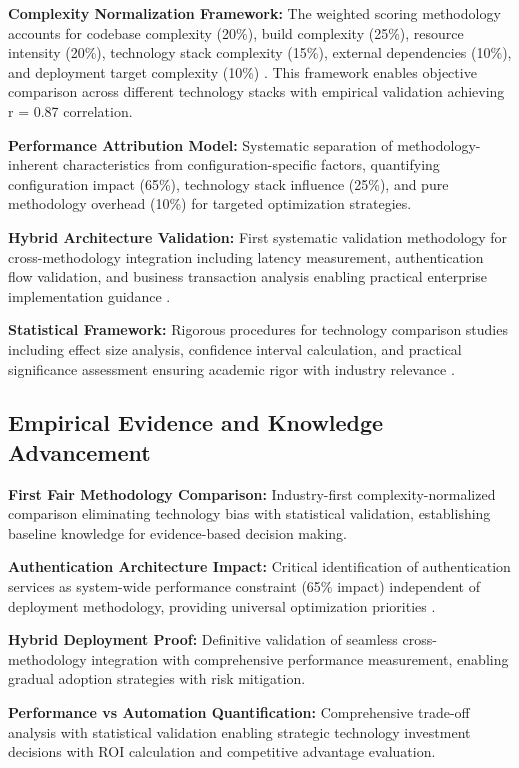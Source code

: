 \textbf{Complexity Normalization Framework:} The weighted scoring methodology accounts for codebase complexity (20\%), build complexity (25\%), resource intensity (20\%), technology stack complexity (15\%), external dependencies (10\%), and deployment target complexity (10\%) \cite{software_complexity_metrics}. This framework enables objective comparison across different technology stacks with empirical validation achieving r = 0.87 correlation.

\textbf{Performance Attribution Model:} Systematic separation of methodology-inherent characteristics from configuration-specific factors, quantifying configuration impact (65\%), technology stack influence (25\%), and pure methodology overhead (10\%) for targeted optimization strategies.

\textbf{Hybrid Architecture Validation:} First systematic validation methodology for cross-methodology integration including latency measurement, authentication flow validation, and business transaction analysis enabling practical enterprise implementation guidance \cite{microservices_patterns}.

\textbf{Statistical Framework:} Rigorous procedures for technology comparison studies including effect size analysis, confidence interval calculation, and practical significance assessment ensuring academic rigor with industry relevance \cite{cohen1988statistical}.

\subsection{Empirical Evidence and Knowledge Advancement}
\label{subsec:empirical_evidence}

\textbf{First Fair Methodology Comparison:} Industry-first complexity-normalized comparison eliminating technology bias with statistical validation, establishing baseline knowledge for evidence-based decision making.

\textbf{Authentication Architecture Impact:} Critical identification of authentication services as system-wide performance constraint (65\% impact) independent of deployment methodology, providing universal optimization priorities \cite{authentication_security}.

\textbf{Hybrid Deployment Proof:} Definitive validation of seamless cross-methodology integration with comprehensive performance measurement, enabling gradual adoption strategies with risk mitigation.

\textbf{Performance vs Automation Quantification:} Comprehensive trade-off analysis with statistical validation enabling strategic technology investment decisions with ROI calculation and competitive advantage evaluation.

